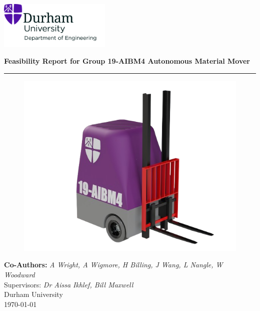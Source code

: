 \documentclass[12pt]{article}
\begin{document}



 
\begin{titlepage}
\centering
\includegraphics[width=0.4\textwidth]{UoD_Engineering.jpg} \\
\vspace{10mm}

{\LARGE \textbf{Feasibility Report for Group 19-AIBM4 Autonomous Material Mover}} \\[10pt]

\vspace{5mm}\hrule\vspace{0mm}

\begin{figure}[h!]
    \centering
     \includegraphics[width=1\textwidth]{Pooled_Design_V2__6_-removebg-preview.png}
\end{figure}  
\vspace{0mm}
\vspace{10mm}

{\large \textbf{Co-Authors: }\textit{A Wright, A Wigmore, H Billing, J Wang, L Nangle, W Woodward}} \\ \vspace{1mm}
{Supervisors:\textit{ Dr Aissa Ikhlef, Bill Maxwell}} \\[10pt]
{\small Durham University \\ \today}
\end{titlepage}
\end{document}
